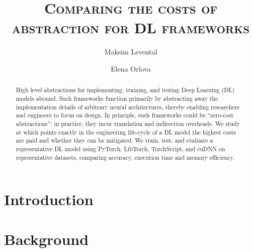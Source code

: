 \documentclass[sigconf]{acmart}
\begin{document}
\title{\textsc{Comparing the costs of abstraction for DL frameworks}}

\author{Maksim Levental}
\author{Elena Orlova}

\renewcommand{\shortauthors}{Levental and Orlova}

\begin{abstract}
  High level abstractions for implementing, training, and testing Deep Learning (DL) models abound.
  Such frameworks function primarily by abstracting away the implementation details of arbitrary neural architectures, thereby enabling researchers and engineers to focus on design.
  In principle, such frameworks could be ``zero-cost abstractions'';
  in practice, they incur translation and indirection overheads.
  We study at which points exactly in the engineering life-cycle of a DL model the highest costs are paid and whether they can be mitigated.
  We train, test, and evaluate a representative DL model using PyTorch, LibTorch, TorchScript, and cuDNN on representative datasets, comparing accuracy, execution time and memory efficiency.
\end{abstract}


\maketitle

\section{Introduction}\label{sec:introduction}


\section{Background}\label{sec:background}

\end{document}
